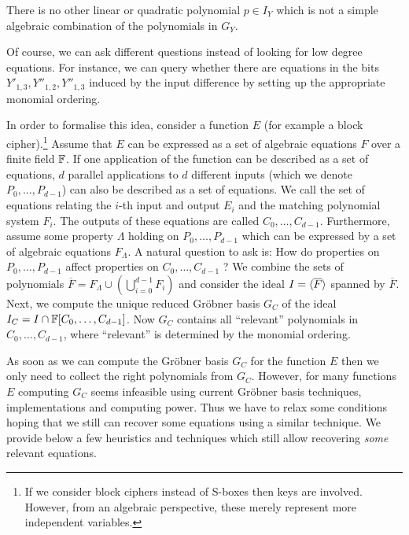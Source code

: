There is no other linear or quadratic polynomial $p \in I_Y$ which is not a simple algebraic combination of the polynomials in $G_Y$. 

Of course, we can ask different questions instead of looking for low degree equations. For instance, we can query whether there are equations in the bits $Y'_{1,3}, Y''_{1,2},Y''_{1,3}$ induced by the input difference by setting up the appropriate monomial ordering.

In order to formalise this idea, consider a function $E$ (for example a block cipher).\footnote{If we consider block ciphers instead of S-boxes then keys are involved. However, from an algebraic perspective, these merely represent more independent variables.} Assume that $E$ can be expressed as a set of algebraic equations $F$ over a finite field $\mathbb{F}$. If one application of the function can be described as a set of equations, \(d\) parallel applications to \(d\) different inputs (which we denote \(P_0, \dots, P_{d-1}\)) can also be described as a set of equations. We call the set of equations  relating the \(i\)-th input and output \(E_i\) and the matching polynomial system \(F_i\). The outputs of these equations are called \(C_0, \dots, C_{d-1}\). Furthermore, assume some property $\Lambda$ holding on $P_0, \dots, P_{d-1}$ which can be expressed by a set of algebraic equations $F_\Lambda$. A natural question to ask is: How do properties on \(P_0, \dots, P_{d-1}\) affect properties on \(C_0, \dots, C_{d-1}\) ? 
We combine the sets of polynomials $\overline{F} = F_\Lambda \cup (\bigcup_{i=0}^{d-1} F_i)$ and consider the ideal \(I = \langle {\overline{F}} \rangle\) spanned by \(\overline{F}\). Next, we compute the unique reduced Gr\"obner basis \(G_C\) of the ideal $I_{C} = I \cap \mathbb{F}[C_0,\dots,C_{d-1}]$. Now $G_C$ contains all ``relevant'' polynomials in $C_0,\dots,C_{d-1}$, where ``relevant'' is determined by the monomial ordering.

As soon as we can compute the Gröbner basis $G_C$ for the function $E$ then we only need to collect the right polynomials from $G_C$. However, for many functions $E$ computing $G_C$ seems infeasible using current Gröbner basis techniques, implementations and computing power. Thus we have to relax some conditions hoping that we still can recover some equations using a similar technique. We provide below  a few heuristics and techniques which still allow recovering \emph{some} relevant equations. 

